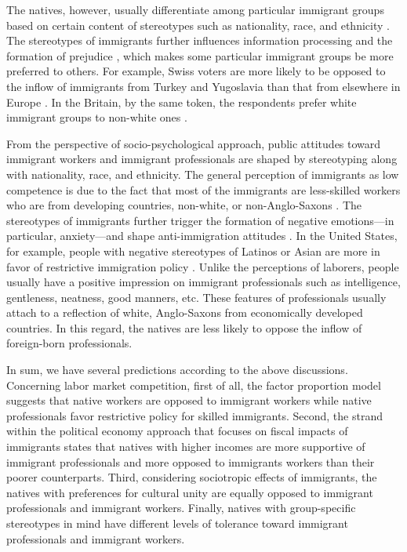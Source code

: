 \documentclass[12pt]{article}
\begin{document}
The natives, however, usually differentiate among particular immigrant groups based on certain content of stereotypes such as nationality, race, and ethnicity \citep{LeeFiske2006}. The stereotypes of immigrants further influences information processing \citep{Vinacke1957} and the formation of prejudice \citep{BodenhausenWyer1985}, which makes some particular immigrant groups be more preferred to others. For example, Swiss voters are more likely to be opposed to the inflow of immigrants from Turkey and Yugoslavia than that from elsewhere in Europe \citep{HainmuellerHangartner2013}. In the Britain, by the same token, the respondents prefer white immigrant groups to non-white ones \citep{Ford2011}.


From the perspective of socio-psychological approach, public attitudes toward immigrant workers and immigrant professionals are shaped by stereotyping along with nationality, race, and ethnicity. The general perception of immigrants as low competence is due to the fact that most of the immigrants are less-skilled workers who are from developing countries, non-white, or non-Anglo-Saxons \citep{LeeFiske2006, ScheveSlaughter2001}. The stereotypes of immigrants further trigger the formation of negative emotions---in particular, anxiety---and shape anti-immigration attitudes \citep{BraderValentinoSuhay2008}. In the United States, for example, people with negative stereotypes of Latinos or Asian are more in favor of restrictive immigration policy \citep{ChandlerTsai2001}. Unlike the perceptions of laborers, people usually have a positive impression on immigrant professionals such as intelligence, gentleness, neatness, good manners, etc. These features of professionals usually attach to a reflection of white, Anglo-Saxons from economically developed countries. In this regard, the natives are less likely to oppose the inflow of foreign-born professionals.


In sum, we have several predictions according to the above discussions. Concerning labor market competition, first of all, the factor proportion model suggests that native workers are opposed to immigrant workers while native professionals favor restrictive policy for skilled immigrants. Second, the strand within the political economy approach that focuses on fiscal impacts of immigrants states that natives with higher incomes are more supportive of immigrant professionals and more opposed to immigrants workers than their poorer counterparts. Third, considering sociotropic effects of immigrants, the natives with preferences for cultural unity are equally opposed to immigrant professionals and immigrant workers. Finally, natives with group-specific stereotypes in mind have different levels of tolerance toward immigrant professionals and immigrant workers.
\end{document}
